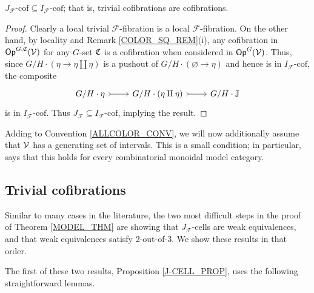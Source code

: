 \documentclass[a4paper,10pt
,draft
]{article}%
\renewcommand{\F}{\mathcal F}
\newcommand{\J}{\mathbb J}
\renewcommand{\1}{\eta}%
\begin{document}
\begin{lemma}
      [{cf. \cite[1.19]{CM13b}}]
      \label{POINT_4_LEMMA}
      $J_{\F}\mbox{-cof} \subseteq I_{\F}\mbox{-cof}$; that is, trivial cofibrations are cofibrations.
\end{lemma}
\begin{proof}
      Clearly a local trivial $\F$-fibration is a local $\F$-fibration.
      On the other hand, by locality and Remark \ref{COLOR_SQ_REM}(i),
      any cofibration in $\mathsf{Op}^{G, \mathfrak C}(\mathcal V)$ for any $G$-set $\mathfrak C$
      is a cofibration when considered in $\mathsf{Op}^G(\mathcal V)$.
      Thus, since $G/H \cdot (\1 \to \1 \amalg \1)$ is a pushout of $G/H \cdot(\varnothing \to \1)$
      and hence is in $I_{\F}\mbox{-cof}$, the composite
      \begin{equation}
            \begin{tikzcd}
                  G/H \cdot \1 \arrow[r, rightarrowtail]
                  &
                  G/H \cdot (\1 \amalg \1) \arrow[r, rightarrowtail]
                  &
                  G/H \cdot \J 
            \end{tikzcd}
      \end{equation}
      is in $I_{\F}\mbox{-cof}$.
      Thus $J_\F \subseteq I_\F\mbox{-cof}$, implying the result.
\end{proof}

\begin{convention}
      \label{GENINT_CONV}
      Adding to Convention \ref{ALLCOLOR_CONV}, we will now additionally assume that $\mathcal V$ has a generating set of intervals.
      This is a small condition; in particular, \cite[Lemma 1.12]{BM13} says that this holds for every combinatorial monoidal model category.
\end{convention}

\subsection{Trivial cofibrations}

Similar to many cases in the literature, the two most difficult steps in the proof of Theorem \ref{MODEL_THM} are showing that
$J_\F$-cells are weak equivalences, and that weak equivalences satisfy 2-out-of-3.
We show these results in that order.

The first of these two results, Proposition \ref{J-CELL_PROP}, uses the following straightforward lemmas.
\end{document}
